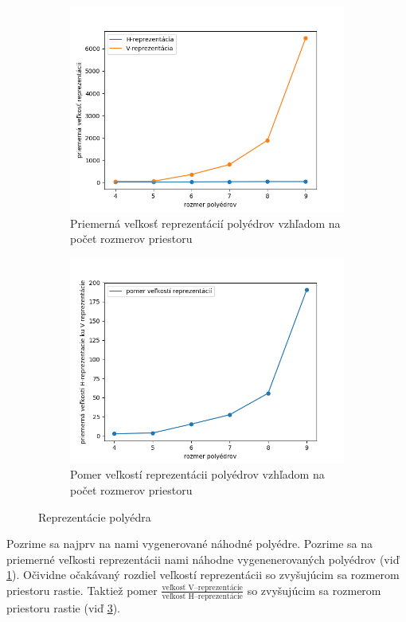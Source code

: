 \begin{figure}[H]
  \centering
  \begin{subfigure}[b]{\linewidth}
    \includegraphics[width=0.9\linewidth]{images/velkost_rep.png}
    \caption{Priemerná veľkosť reprezentácií polyédrov vzhľadom na počet rozmerov priestoru}
	\label{fig:velkost_rep}
  \end{subfigure}
  \begin{subfigure}[b]{\linewidth}
    \includegraphics[width=0.9\linewidth]{images/pomer_rep.png}
    \caption{Pomer veľkostí reprezentácii polyédrov vzhľadom na počet rozmerov priestoru}
	\label{fig:pomer_rep}
  \end{subfigure}
  \caption{Reprezentácie polyédra}
\end{figure}

Pozrime sa najprv na nami vygenerované náhodné polyédre. Pozrime sa na priemerné veľkosti reprezentácii nami náhodne vygenenerovaných polyédrov (viď \ref{fig:velkost_rep}). Očividne očakávaný rozdiel veľkostí reprezentácii so zvyšujúcim sa rozmerom priestoru rastie. Taktiež pomer $\frac{\text{veľkosť V--reprezentácie}}{\text{veľkosť H--reprezentácie}}$ so zvyšujúcim sa rozmerom priestoru rastie (viď \ref{fig:pomer_rep}).


